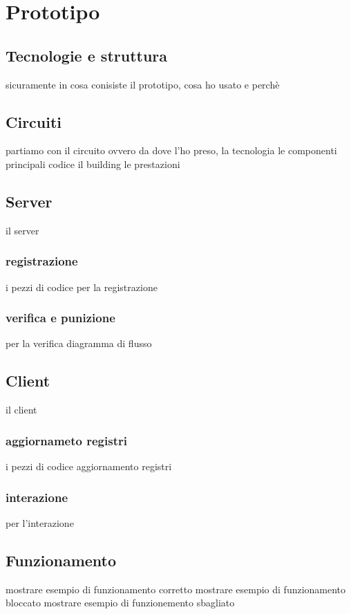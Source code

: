 \chapter*{Prototipo}

\section{Tecnologie e struttura}
sicuramente in cosa conisiste il prototipo, cosa ho usato e perchè

\section{Circuiti}
partiamo con il circuito ovvero da dove l'ho preso, la tecnologia
le componenti principali codice
il building
le prestazioni

\section{Server}

il server
\subsection{registrazione}
i pezzi di codice per la registrazione
\subsection{verifica e punizione}
per la verifica diagramma di flusso

\section{Client}
il client
\subsection{aggiornameto registri}
i pezzi di codice aggiornamento registri
\subsection{interazione}
per l'interazione

\section{Funzionamento}
mostrare esempio di funzionamento corretto 
mostrare esempio di funzionamento bloccato
mostrare esempio di funzionemento sbagliato